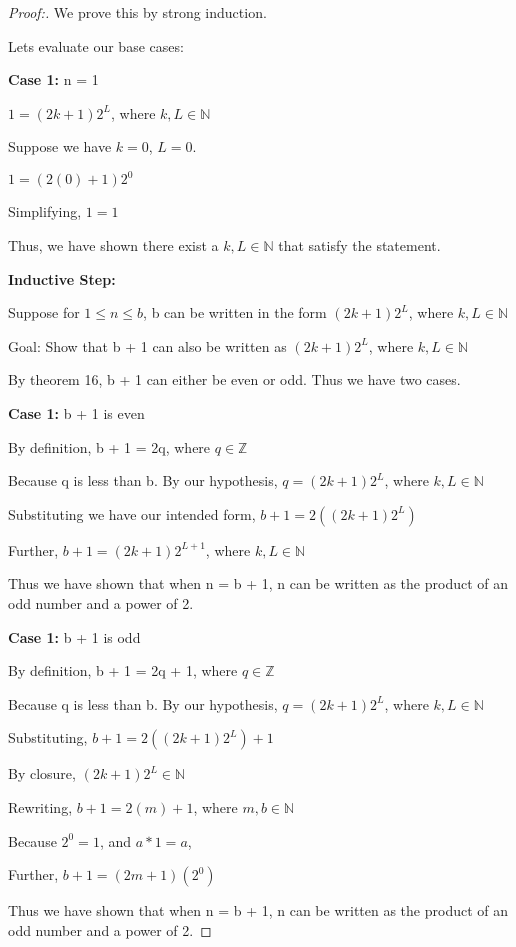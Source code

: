 \documentclass[12pt]{article}
\begin{document}
\begin{proof}[Proof:]
    We prove this by strong induction.

    Lets evaluate our base cases:

    \medbreak

    \textbf{Case 1:} n = 1

    $1 = (2k + 1)2^L$, where $k, L \in \mathbb{N}$

    Suppose we have $k = 0$, $L = 0$.

    $1 = (2(0) + 1)2^0$

    Simplifying,  $1 = 1$

    Thus, we have shown there exist a $k, L \in \mathbb{N}$ that satisfy the statement.

    \medbreak

    \textbf{Inductive Step:}

    Suppose for $1 \leq n \leq b$, b can be written in the form $(2k + 1)2^L$, where $k, L \in \mathbb{N}$

    Goal: Show that b + 1 can also be written as $(2k + 1)2^L$, where $k, L \in \mathbb{N}$

    By theorem 16, b + 1 can either be even or odd. Thus we have two cases.

    \medbreak

    \textbf{Case 1:} b + 1 is even

    By definition, b + 1 = 2q, where $q \in \mathbb{Z}$

    Because q is less than b. By our hypothesis, $q = (2k + 1)2^L$, where $k, L \in \mathbb{N}$

    Substituting we have our intended form, $b + 1 = 2((2k + 1)2^L)$

    Further, $b + 1 = (2k + 1)2^{L + 1}$, where $k, L \in \mathbb{N}$

    Thus we have shown that when n = b + 1, n can be written as the product of an odd number and a power of 2.

    \medbreak

    \textbf{Case 1:} b + 1 is odd

    By definition, b + 1 = 2q + 1, where $q \in \mathbb{Z}$

    Because q is less than b. By our hypothesis, $q = (2k + 1)2^L$, where $k, L \in \mathbb{N}$

    Substituting, $b + 1 = 2((2k + 1)2^L) + 1$

    By closure, $(2k + 1)2^L \in \mathbb{N}$ 

    Rewriting, $b + 1 = 2(m) + 1$, where $m, b \in \mathbb{N}$

    Because $2^0 = 1$, and $a * 1 = a$,

    Further, $b + 1 = (2m + 1)(2^0)$

    Thus we have shown that when n = b + 1, n can be written as the product of an odd number and a power of 2.

    \medbreak

\end{proof}
\end{document}
